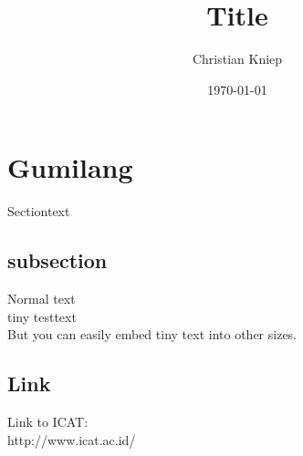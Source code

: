 \documentclass[11pt]{article}
\author{Christian Kniep}
\title{Title}
\date{\today}
\begin{document}
\maketitle
\section{Gumilang}
Sectiontext
\subsection{subsection}
Normal text \\ %
\tiny           %
tiny testtext \\
\normalsize     %
But you can easily embed {\tiny tiny text} into other sizes.
\subsection{Link}
Link to ICAT: \\
http://www.icat.ac.id/ \\
\end{document}
